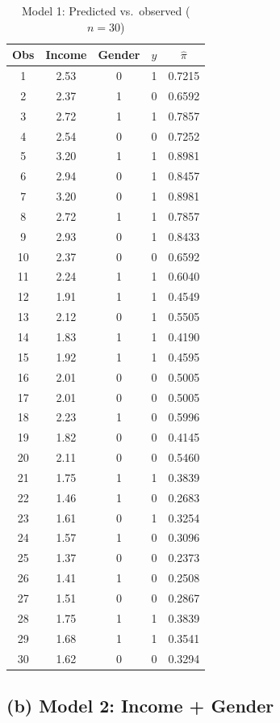 \documentclass[12pt,a4paper]{article}
\begin{document}
\begin{table}[H]
\centering
\caption{Model 1: Predicted vs.\ observed ($n = 30$)}
\footnotesize
\begin{tabular}{ccccc}
\toprule
Obs & Income & Gender & $y$ & $\hat{\pi}$ \\
\midrule
 1 & 2.53 & 0 & 1 & 0.7215 \\
 2 & 2.37 & 1 & 0 & 0.6592 \\
 3 & 2.72 & 1 & 1 & 0.7857 \\
 4 & 2.54 & 0 & 0 & 0.7252 \\
 5 & 3.20 & 1 & 1 & 0.8981 \\
 6 & 2.94 & 0 & 1 & 0.8457 \\
 7 & 3.20 & 0 & 1 & 0.8981 \\
 8 & 2.72 & 1 & 1 & 0.7857 \\
 9 & 2.93 & 0 & 1 & 0.8433 \\
10 & 2.37 & 0 & 0 & 0.6592 \\
11 & 2.24 & 1 & 1 & 0.6040 \\
12 & 1.91 & 1 & 1 & 0.4549 \\
13 & 2.12 & 0 & 1 & 0.5505 \\
14 & 1.83 & 1 & 1 & 0.4190 \\
15 & 1.92 & 1 & 1 & 0.4595 \\
16 & 2.01 & 0 & 0 & 0.5005 \\
17 & 2.01 & 0 & 0 & 0.5005 \\
18 & 2.23 & 1 & 0 & 0.5996 \\
19 & 1.82 & 0 & 0 & 0.4145 \\
20 & 2.11 & 0 & 0 & 0.5460 \\
21 & 1.75 & 1 & 1 & 0.3839 \\
22 & 1.46 & 1 & 0 & 0.2683 \\
23 & 1.61 & 0 & 1 & 0.3254 \\
24 & 1.57 & 1 & 0 & 0.3096 \\
25 & 1.37 & 0 & 0 & 0.2373 \\
26 & 1.41 & 1 & 0 & 0.2508 \\
27 & 1.51 & 0 & 0 & 0.2867 \\
28 & 1.75 & 1 & 1 & 0.3839 \\
29 & 1.68 & 1 & 1 & 0.3541 \\
30 & 1.62 & 0 & 0 & 0.3294 \\
\bottomrule
\end{tabular}
\end{table}

\subsection{(b) Model 2: Income + Gender}
\end{document}
